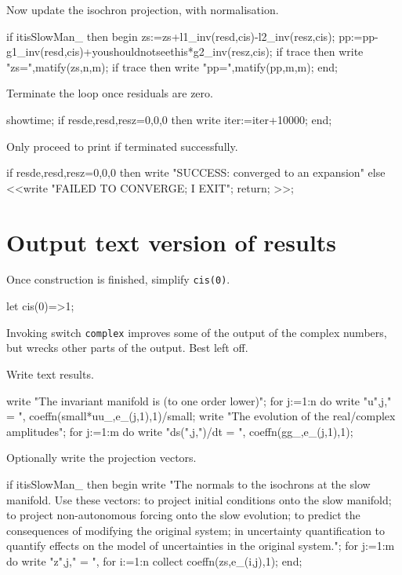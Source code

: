 \documentclass[11pt,a5paper]{article}
\begin{document}
Now update the isochron projection, with normalisation.
\begin{reduce}
if itisSlowMan_ then begin
zs:=zs+l1_inv(resd,cis)-l2_inv(resz,cis);
pp:=pp-g1_inv(resd,cis)+youshouldnotseethis*g2_inv(resz,cis);
if trace then write "zs=",matify(zs,n,m);
if trace then write "pp=",matify(pp,m,m);
end;
\end{reduce}


Terminate the loop once residuals are zero.
\begin{reduce}
showtime;
if {resde,resd,resz}={0,0,0} then write iter:=iter+10000;
end;
\end{reduce}

Only proceed to print if terminated successfully.
\begin{reduce}
if {resde,resd,resz}={0,0,0} 
  then write "SUCCESS: converged to an expansion"
  else <<write "FAILED TO CONVERGE; I EXIT";
    return; >>;
\end{reduce}





\section{Output text version of results}

Once construction is finished, simplify \verb|cis(0)|.
\begin{reduce}
let cis(0)=>1;
\end{reduce}

Invoking switch \verb|complex| improves some of the output
of the complex numbers, but wrecks other parts of the
output.  Best left off.


Write text results.
\begin{reduce}
write "The invariant manifold is (to one order lower)";
for j:=1:n do write "u",j," = ",
  coeffn(small*uu_,e_(j,1),1)/small;
write "The evolution of the real/complex amplitudes";
for j:=1:m do write "ds(",j,")/dt = ",
  coeffn(gg_,e_(j,1),1);
\end{reduce}

Optionally write the projection vectors.
\begin{reduce}
if itisSlowMan_ then begin
  write "The normals to the isochrons at the slow manifold.
Use these vectors: to project initial conditions
onto the slow manifold; to project non-autonomous
forcing onto the slow evolution; to predict the
consequences of modifying the original system; in
uncertainty quantification to quantify effects on
the model of uncertainties in the original system.";
  for j:=1:m do write "z",j," = ",
    for i:=1:n collect coeffn(zs,e_(i,j),1);
end;
\end{reduce}
\end{document}
